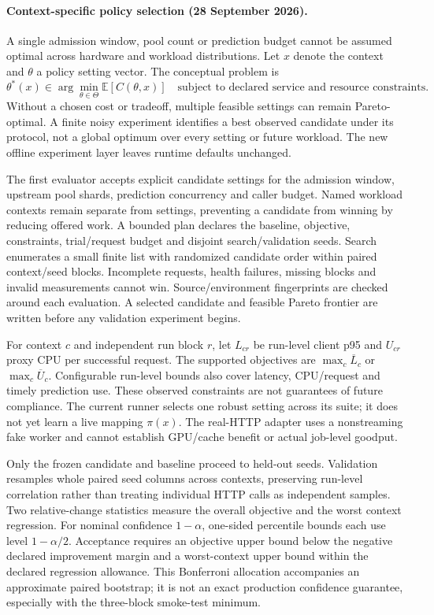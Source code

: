 \paragraph{Context-specific policy selection (28 September 2026).}
A single admission window, pool count or prediction budget cannot be assumed
optimal across hardware and workload distributions. Let $x$ denote the context
and $\theta$ a policy setting vector. The conceptual problem is
\[
 \theta^*(x)\in\arg\min_{\theta\in\Theta}
       \mathbb{E}[C(\theta,x)]
 \quad\text{subject to declared service and resource constraints.}
\]
Without a chosen cost or tradeoff, multiple feasible settings can remain
Pareto-optimal. A finite noisy experiment identifies a best observed candidate
under its protocol, not a global optimum over every setting or future workload.
The new offline experiment layer leaves runtime defaults unchanged.

The first evaluator accepts explicit candidate settings for the admission window,
upstream pool shards, prediction concurrency and caller budget. Named workload
contexts remain separate from settings, preventing a candidate from winning by
reducing offered work. A bounded plan declares the baseline, objective,
constraints, trial/request budget and disjoint search/validation seeds. Search
enumerates a small finite list with randomized candidate order within paired
context/seed blocks. Incomplete requests, health failures, missing blocks and
invalid measurements cannot win. Source/environment fingerprints are checked
around each evaluation. A selected candidate and feasible Pareto frontier are
written before any validation experiment begins.

For context $c$ and independent run block $r$, let $L_{cr}$ be run-level client
p95 and $U_{cr}$ proxy CPU per successful request. The supported objectives are
$\max_c\overline{L}_c$ or $\max_c\overline{U}_c$. Configurable run-level bounds
also cover latency, CPU/request and timely prediction use. These observed
constraints are not guarantees of future compliance. The current runner selects
one robust setting across its suite; it does not yet learn a live mapping
$\pi(x)$. The real-HTTP adapter uses a nonstreaming fake worker and cannot establish
GPU/cache benefit or actual job-level goodput.

Only the frozen candidate and baseline proceed to held-out seeds. Validation
resamples whole paired seed columns across contexts, preserving run-level
correlation rather than treating individual HTTP calls as independent samples.
Two relative-change statistics measure the overall objective and the worst
context regression. For nominal confidence $1-\alpha$, one-sided percentile
bounds each use level $1-\alpha/2$. Acceptance requires an objective upper bound
below the negative declared improvement margin and a worst-context upper bound
within the declared regression allowance. This Bonferroni allocation accompanies
an approximate paired bootstrap; it is not an exact production confidence
guarantee, especially with the three-block smoke-test minimum.

